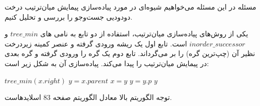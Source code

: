 ‌مسئله
در این مسئله می‌خواهیم شیوه‌ای در مورد پیاده‌سازی پیمایش میان‌ترتیب درخت دودودیی جست‌وجو
را بررسی و تحلیل کنیم.


یکی از روش‌های پیاده‌سازی میان‌ترتیب، استفاده از دو تابع به نامی های $tree\_min$ و $inorder\_successor$ است. تابع اول یک ریشه ورودی گرفته و عنصر کمینه زیردرخت نظیر آن (چپ‌ترین گره) را بر می‌گرداند. تابع دوم یک گره را ورودی گرفته و گره بعدی در پیمایش میان‌ترتیب را پیدا می‌کند. پیاده‌سازی آن به شکل زیر است:

\begin{latin}
\begin{algorithm}[H]
	\begin{algorithmic}
	
		\Return  $tree\_min(x.right)$
		\EndIf
		\State $y = x.parent$
		\State $x = y$
		\State $y = y.p$
		\EndWhile
		\Return $y$
		\EndProcedure
	\end{algorithmic}
\end{algorithm}	
	
\end{latin}

توجه الگوریتم بالا معادل الگوریتم صفحه $83$ اسلایدهاست.


